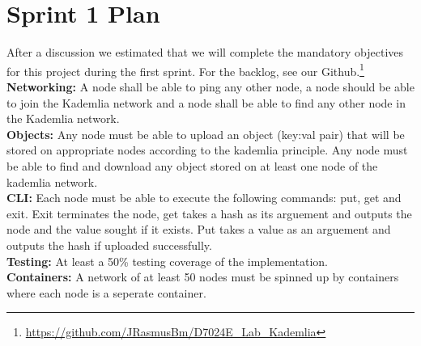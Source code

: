 \documentclass[a4paper]{article}
\begin{document}
\newpage

\section{Sprint 1 Plan}
After a discussion we estimated that we will complete the mandatory objectives for this project during the first sprint. For the backlog, see our Github.\footnote{\href{https://github.com/JRasmusBm/D7024E_Lab_Kademlia}{https://github.com/JRasmusBm/D7024E\_Lab\_Kademlia}}\\

\textbf{Networking:} A node shall be able to ping any other node, a node should be able to join the Kademlia network and a node shall be able to find any other node in the Kademlia network.\\

\textbf{Objects:} Any node must be able to upload an object (key:val pair) that will be stored on appropriate nodes according to the kademlia principle. Any node must be able to find and download any object stored on at least one node of the kademlia network.\\

\textbf{CLI:} Each node must be able to execute the following commands: put, get and exit. Exit terminates the node, get takes a hash as its arguement and outputs the node and the value sought if it exists. Put takes a value as an arguement and outputs the hash if uploaded successfully.\\

\textbf{Testing:} At least a 50\% testing coverage of the implementation.\\

\textbf{Containers:} A network of at least 50 nodes must be spinned up by containers where each node is a seperate container.\\



\end{document}
